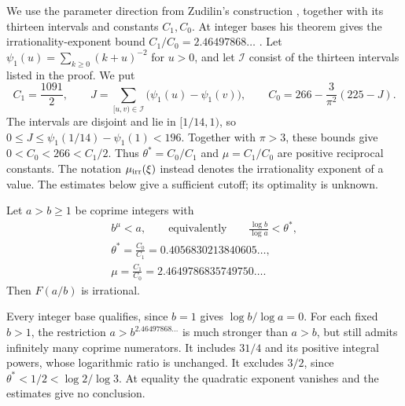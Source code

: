 \documentclass[11pt]{article}
\begin{document}
We use the parameter direction from Zudilin's construction
\cite[\S5, pp.~161--162]{zudilin2004}, together with its thirteen
intervals and constants $C_1,C_0$. At integer bases his theorem gives
the irrationality-exponent bound $C_1/C_0=2.46497868\ldots$
\cite[Thm.~1, p.~154]{zudilin2004}.
Let $\psi_1(u)=\sum_{k\ge0}(k+u)^{-2}$ for $u>0$, and let
$\mathcal I$ consist of the thirteen intervals listed in the proof.
We put
\begin{equation}\label{eq:threshold-constants}
 C_1=\frac{1091}{2},\qquad
 J=\sum_{[u,v)\in\mathcal I}\bigl(\psi_1(u)-\psi_1(v)\bigr),\qquad
 C_0=266-\frac3{\pi^2}(225-J).
\end{equation}
The intervals are disjoint and lie in $[1/14,1)$, so
$0\le J\le\psi_1(1/14)-\psi_1(1)<196$.
Together with $\pi>3$, these bounds give $0<C_0<266<C_1/2$.
Thus $\theta^*=C_0/C_1$ and $\mu=C_1/C_0$ are positive reciprocal
constants. The notation $\mu_{\rm irr}(\xi)$ instead denotes the
irrationality exponent of a value. The estimates below give a sufficient cutoff; its optimality is unknown.


\begin{theorem}
\label{res:rational-base-threshold}
Let $a>b\ge1$ be coprime integers with
\[
\begin{gathered}
 b^{\mu}<a,\qquad\text{equivalently}\qquad
 \frac{\log b}{\log a}<\theta^*,\\
 \theta^*=\frac{C_0}{C_1}=0.4056830213840605\ldots,\\
 \mu=\frac{C_1}{C_0}=2.4649786835749750\ldots.
\end{gathered}
\]
Then $F(a/b)$ is irrational.
\end{theorem}

\noindent Every integer base qualifies, since $b=1$ gives
$\log b/\log a=0$. For each fixed $b>1$, the restriction
$a>b^{2.46497868\ldots}$ is much stronger than $a>b$, but still
admits infinitely many coprime numerators. It includes $31/4$ and
its positive integral powers, whose logarithmic ratio is unchanged.
It excludes $3/2$, since $\theta^*<1/2<\log2/\log3$.
At equality the quadratic exponent vanishes and the estimates give
no conclusion.
\end{document}

